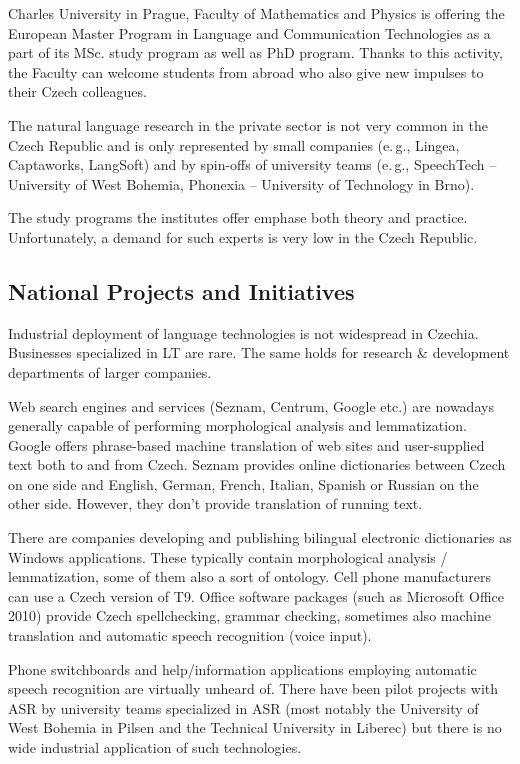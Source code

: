 \begin{multicols}{2}
Charles University in Prague, Faculty of Mathematics and Physics is offering the European Master Program in Language and Communication Technologies as a part of its MSc. study program as well as PhD program. Thanks to this activity, the Faculty can welcome students from abroad who also give new impulses to their Czech colleagues.

The natural language research in the private sector is not very common in the Czech Republic and is only represented by small companies (e.\,g., Lingea, Captaworks, LangSoft) and by spin-offs of university teams (e.\,g., SpeechTech -- University of West Bohemia, Phonexia -- University of Technology in Brno).

The study programs the institutes offer emphase both theory and practice. Unfortunately, a demand for such experts is very low in the Czech Republic.

\subsection{National Projects and Initiatives}
Industrial deployment of language technologies is not widespread in Czechia. Businesses specialized in LT are rare. The same holds for research \& development departments of larger companies.

Web search engines and services (Seznam, Centrum, Google etc.) are nowadays generally capable of performing morphological analysis and lemmatization. Google offers phrase-based machine translation of web sites and user-supplied text both to and from Czech. Seznam provides online dictionaries between Czech on one side and English, German, French, Italian, Spanish or Russian on the other side. However, they don’t provide translation of running text.

There are companies developing and publishing bilingual electronic dictionaries as Windows applications. These typically contain morphological analysis / lemmatization, some of them also a sort of ontology.
Cell phone manufacturers can use a Czech version of T9.
Office software packages (such as Microsoft Office 2010) provide Czech spellchecking, grammar checking, sometimes also machine translation and automatic speech recognition (voice input).

Phone switchboards and help/information applications employing automatic speech recognition are virtually unheard of. There have been pilot projects with ASR by university teams specialized in ASR (most notably the University of West Bohemia in Pilsen and the Technical University in Liberec) but there is no wide industrial application of such technologies.


\end{multicols}
